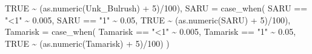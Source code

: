 \documentclass[
]{book}
\newenvironment{Shaded}{\begin{snugshade}}{\end{snugshade}}
\newcommand{\AttributeTok}[1]{\textcolor[rgb]{0.77,0.63,0.00}{#1}}
\newcommand{\ConstantTok}[1]{\textcolor[rgb]{0.00,0.00,0.00}{#1}}
\newcommand{\DecValTok}[1]{\textcolor[rgb]{0.00,0.00,0.81}{#1}}
\newcommand{\FloatTok}[1]{\textcolor[rgb]{0.00,0.00,0.81}{#1}}
\newcommand{\FunctionTok}[1]{\textcolor[rgb]{0.00,0.00,0.00}{#1}}
\newcommand{\NormalTok}[1]{#1}
\newcommand{\SpecialCharTok}[1]{\textcolor[rgb]{0.00,0.00,0.00}{#1}}
\newcommand{\StringTok}[1]{\textcolor[rgb]{0.31,0.60,0.02}{#1}}
\begin{document}
\begin{Shaded}
\begin{Highlighting}[]
          \ConstantTok{TRUE} \SpecialCharTok{\textasciitilde{}}\NormalTok{ (}\FunctionTok{as.numeric}\NormalTok{(Unk\_Bulrush) }\SpecialCharTok{+} \DecValTok{5}\NormalTok{)}\SpecialCharTok{/}\DecValTok{100}\NormalTok{),}
        \AttributeTok{SARU =} \FunctionTok{case\_when}\NormalTok{(}
\NormalTok{          SARU }\SpecialCharTok{==} \StringTok{"\textless{}1"} \SpecialCharTok{\textasciitilde{}} \FloatTok{0.005}\NormalTok{, }
\NormalTok{          SARU }\SpecialCharTok{==} \StringTok{"1"} \SpecialCharTok{\textasciitilde{}} \FloatTok{0.05}\NormalTok{, }
          \ConstantTok{TRUE} \SpecialCharTok{\textasciitilde{}}\NormalTok{ (}\FunctionTok{as.numeric}\NormalTok{(SARU) }\SpecialCharTok{+} \DecValTok{5}\NormalTok{)}\SpecialCharTok{/}\DecValTok{100}\NormalTok{),}
        \AttributeTok{Tamarisk =} \FunctionTok{case\_when}\NormalTok{(}
\NormalTok{          Tamarisk }\SpecialCharTok{==} \StringTok{"\textless{}1"} \SpecialCharTok{\textasciitilde{}} \FloatTok{0.005}\NormalTok{, }
\NormalTok{          Tamarisk }\SpecialCharTok{==} \StringTok{"1"} \SpecialCharTok{\textasciitilde{}} \FloatTok{0.05}\NormalTok{, }
          \ConstantTok{TRUE} \SpecialCharTok{\textasciitilde{}}\NormalTok{ (}\FunctionTok{as.numeric}\NormalTok{(Tamarisk) }\SpecialCharTok{+} \DecValTok{5}\NormalTok{)}\SpecialCharTok{/}\DecValTok{100}\NormalTok{)}
\NormalTok{  )}
\end{Highlighting}
\end{Shaded}
\end{document}

